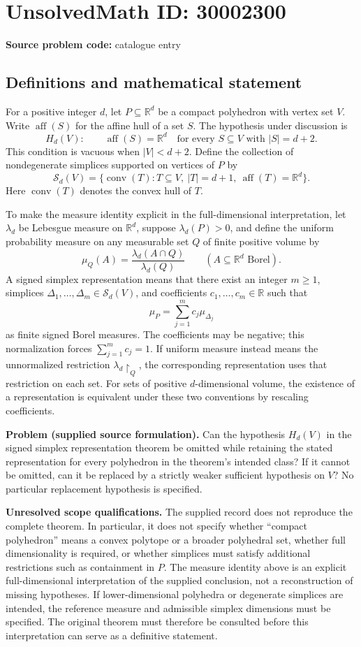 \documentclass[11pt]{article}
\newcommand{\R}{\mathbb{R}}
\begin{document}
\section*{UnsolvedMath ID: 30002300}
\textbf{Source problem code:} catalogue entry
\subsection{Definitions and mathematical statement}
For a positive integer \(d\), let \(P\subseteq\R^d\) be a compact polyhedron with vertex set \(V\). Write \(\operatorname{aff}(S)\) for the affine hull of a set \(S\). The hypothesis under discussion is
\[
H_d(V):\qquad \operatorname{aff}(S)=\R^d\quad\text{for every }S\subseteq V\text{ with }|S|=d+2.
\]
This condition is vacuous when \(|V|<d+2\). Define the collection of nondegenerate simplices supported on vertices of \(P\) by
\[
\mathcal S_d(V)=\bigl\{\operatorname{conv}(T):T\subseteq V,\ |T|=d+1,\ \operatorname{aff}(T)=\R^d\bigr\}.
\]
Here \(\operatorname{conv}(T)\) denotes the convex hull of \(T\).

To make the measure identity explicit in the full-dimensional interpretation, let \(\lambda_d\) be Lebesgue measure on \(\R^d\), suppose \(\lambda_d(P)>0\), and define the uniform probability measure on any measurable set \(Q\) of finite positive volume by
\[
\mu_Q(A)=\frac{\lambda_d(A\cap Q)}{\lambda_d(Q)}\qquad(A\subseteq\R^d\text{ Borel}).
\]
A signed simplex representation means that there exist an integer \(m\geq1\), simplices \(\Delta_1,\ldots,\Delta_m\in\mathcal S_d(V)\), and coefficients \(c_1,\ldots,c_m\in\R\) such that
\[
\mu_P=\sum_{j=1}^{m}c_j\mu_{\Delta_j}
\]
as finite signed Borel measures. The coefficients may be negative; this normalization forces \(\sum_{j=1}^{m}c_j=1\). If uniform measure instead means the unnormalized restriction \(\lambda_d\!\restriction_Q\), the corresponding representation uses that restriction on each set. For sets of positive \(d\)-dimensional volume, the existence of a representation is equivalent under these two conventions by rescaling coefficients.

\textbf{Problem (supplied source formulation).} Can the hypothesis \(H_d(V)\) in the signed simplex representation theorem be omitted while retaining the stated representation for every polyhedron in the theorem's intended class? If it cannot be omitted, can it be replaced by a strictly weaker sufficient hypothesis on \(V\)? No particular replacement hypothesis is specified.

\textbf{Unresolved scope qualifications.} The supplied record does not reproduce the complete theorem. In particular, it does not specify whether ``compact polyhedron'' means a convex polytope or a broader polyhedral set, whether full dimensionality is required, or whether simplices must satisfy additional restrictions such as containment in \(P\). The measure identity above is an explicit full-dimensional interpretation of the supplied conclusion, not a reconstruction of missing hypotheses. If lower-dimensional polyhedra or degenerate simplices are intended, the reference measure and admissible simplex dimensions must be specified. The original theorem must therefore be consulted before this interpretation can serve as a definitive statement.
\end{document}
